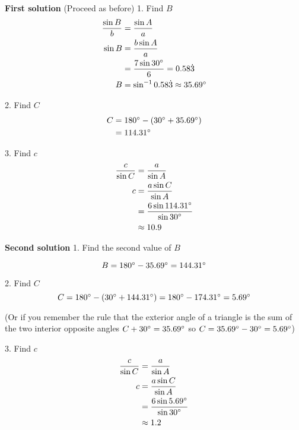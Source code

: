 \textbf{First solution} (Proceed as before) 
1. Find $B$
\begin{align*}\frac{\sin  B}{b} &  = \frac{\sin  A}{a} \\
\sin  B &  = \frac{b \sin  A}{a} \\
&  = \frac{7 \sin  30 \mbox{{\ensuremath{{}^\circ}}}}{6} =0.58 \dot{3} \\
B &  = \sin ^{ -1} 0.58 \dot{3} \approx 35.69 \mbox{{\ensuremath{{}^\circ}}}\end{align*}

2. Find $C$
\begin{align*}C &  = 180 \mbox{{\ensuremath{{}^\circ}}} -(30 \mbox{{\ensuremath{{}^\circ}}} +35.69 \mbox{{\ensuremath{{}^\circ}}}) \\
&  = 114.31 \mbox{{\ensuremath{{}^\circ}}}\end{align*}

3. Find $c$
\begin{align*}\frac{c}{\sin  C} &  = \frac{a}{\sin  A} \\
c &  = \frac{a \sin  C}{\sin  A} \\
&  = \frac{6 \sin  114.31 \mbox{{\ensuremath{{}^\circ}}}}{\sin  30 \mbox{{\ensuremath{{}^\circ}}}} \\
&  \approx   10.9\end{align*}

\textbf{Second solution} 
1. Find the second value of $B$ 

\begin{equation*}B =180 \mbox{{\ensuremath{{}^\circ}}} -35.69 \mbox{{\ensuremath{{}^\circ}}} =144.31 \mbox{{\ensuremath{{}^\circ}}}
\end{equation*}

2. Find $C$
\begin{equation*}C =180 \mbox{{\ensuremath{{}^\circ}}} -(30 \mbox{{\ensuremath{{}^\circ}}} +144.31 \mbox{{\ensuremath{{}^\circ}}}) =180 \mbox{{\ensuremath{{}^\circ}}} -174.31 \mbox{{\ensuremath{{}^\circ}}} =5.69 \mbox{{\ensuremath{{}^\circ}}}
\end{equation*}

(Or if you remember the rule that the exterior angle of a triangle is the sum of the two interior
opposite angles $C +30 \mbox{{\ensuremath{{}^\circ}}} =35.69 \mbox{{\ensuremath{{}^\circ}}}$ so $C =35.69 \mbox{{\ensuremath{{}^\circ}}} -30 \mbox{{\ensuremath{{}^\circ}}} =5.69 \mbox{{\ensuremath{{}^\circ}}}$) 

3. Find $c$
\begin{align*}\frac{c}{\sin  C} &  = \frac{a}{\sin  A} \\
c &  = \frac{a \sin  C}{\sin  A} \\
&  = \frac{6 \sin  5.69 \mbox{{\ensuremath{{}^\circ}}}}{\sin  30 \mbox{{\ensuremath{{}^\circ}}}} \\
&  \approx   1.2\end{align*}


